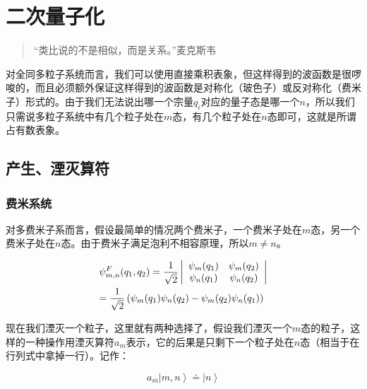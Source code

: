\section{二次量子化}

\begin{quotation}
“类比说的不是相似，而是关系。”\qquad 麦克斯韦
\end{quotation}

对全同多粒子系统而言，我们可以使用直接乘积表象，但这样得到的波函数是很啰唆的，而且必须额外保证这样得到的波函数是对称化（玻色子）或反对称化（费米子）形式的。由于我们无法说出哪一个宗量$q_i$对应的量子态是哪一个$n$，所以我们只需说多粒子系统中有几个粒子处在$m$态，有几个粒子处在$n$态即可，这就是所谓占有数表象。

\subsection{产生、湮灭算符}

\subsubsection{费米系统}

对多费米子系而言，假设最简单的情况两个费米子，一个费米子处在$m$态，另一个费米子处在$n$态。由于费米子满足泡利不相容原理，所以$
m \ne n$。

\begin{equation}\label{two fermions wave function}
\begin{gathered}
\psi _{m,n}^F (q_1 ,q_2 ) = \frac{1} {{\sqrt 2 }}\left|
{\begin{array}{*{20}c}
   {\psi _m (q_1 )} & {\psi _m (q_2 )}  \\
   {\psi _n (q_1 )} & {\psi _n (q_2 )}  \\
\end{array} } \right| \hfill \\
= \frac{1}{{\sqrt 2 }}\left( {\psi _m (q_1
)\psi _n (q_2 ) - \psi _m (q_2 )\psi _n (q_1 )} \right) \hfill \\
\end{gathered}
\end{equation}


现在我们湮灭一个粒子，这里就有两种选择了，假设我们湮灭一个$m$态的粒子，这样的一种操作用湮灭算符$a_m$表示，它的后果是只剩下一个粒子处在$n$态（相当于在行列式中拿掉一行）。记作：

\begin{equation}\label{ferminon anni}
a_m \left| {m,n} \right\rangle  \doteq \left| n \right\rangle
\end{equation}


